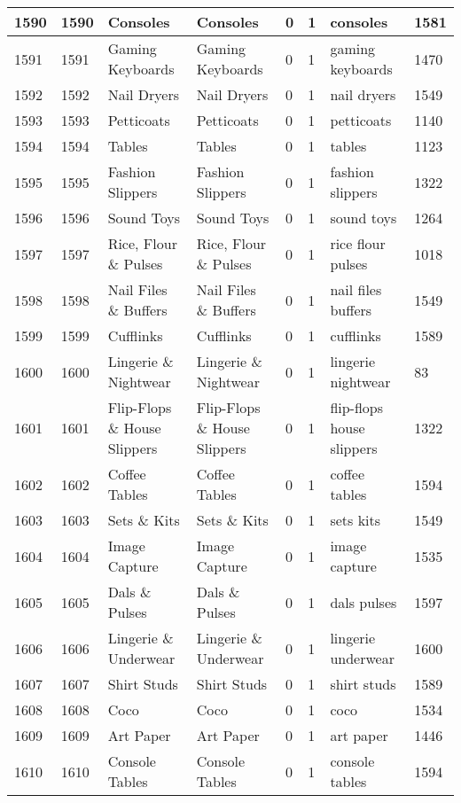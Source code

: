 \begin{longtable}{|l|l|l|l|l|l|l|l|}
1590 & 1590 & Consoles & Consoles & 0 & 1 & consoles & 1581 \\ \hline 
1591 & 1591 & Gaming Keyboards & Gaming Keyboards & 0 & 1 & gaming keyboards & 1470 \\ \hline 
1592 & 1592 & Nail Dryers & Nail Dryers & 0 & 1 & nail dryers & 1549 \\ \hline 
1593 & 1593 & Petticoats & Petticoats & 0 & 1 & petticoats & 1140 \\ \hline 
1594 & 1594 & Tables & Tables & 0 & 1 & tables & 1123 \\ \hline 
1595 & 1595 & Fashion Slippers & Fashion Slippers & 0 & 1 & fashion slippers & 1322 \\ \hline 
1596 & 1596 & Sound Toys & Sound Toys & 0 & 1 & sound toys & 1264 \\ \hline 
1597 & 1597 & Rice, Flour \& Pulses & Rice, Flour \& Pulses & 0 & 1 & rice flour pulses & 1018 \\ \hline 
1598 & 1598 & Nail Files \& Buffers & Nail Files \& Buffers & 0 & 1 & nail files buffers & 1549 \\ \hline 
1599 & 1599 & Cufflinks & Cufflinks & 0 & 1 & cufflinks & 1589 \\ \hline 
1600 & 1600 & Lingerie \& Nightwear & Lingerie \& Nightwear & 0 & 1 & lingerie nightwear & 83 \\ \hline 
1601 & 1601 & Flip-Flops \& House Slippers & Flip-Flops \& House Slippers & 0 & 1 & flip-flops house slippers & 1322 \\ \hline 
1602 & 1602 & Coffee Tables & Coffee Tables & 0 & 1 & coffee tables & 1594 \\ \hline 
1603 & 1603 & Sets \& Kits & Sets \& Kits & 0 & 1 & sets kits & 1549 \\ \hline 
1604 & 1604 & Image Capture & Image Capture & 0 & 1 & image capture & 1535 \\ \hline 
1605 & 1605 & Dals \& Pulses & Dals \& Pulses & 0 & 1 & dals pulses & 1597 \\ \hline 
1606 & 1606 & Lingerie \& Underwear & Lingerie \& Underwear & 0 & 1 & lingerie underwear & 1600 \\ \hline 
1607 & 1607 & Shirt Studs & Shirt Studs & 0 & 1 & shirt studs & 1589 \\ \hline 
1608 & 1608 & Coco & Coco & 0 & 1 & coco & 1534 \\ \hline 
1609 & 1609 & Art Paper & Art Paper & 0 & 1 & art paper & 1446 \\ \hline 
1610 & 1610 & Console Tables & Console Tables & 0 & 1 & console tables & 1594 \\ \hline 

\end{longtable}
